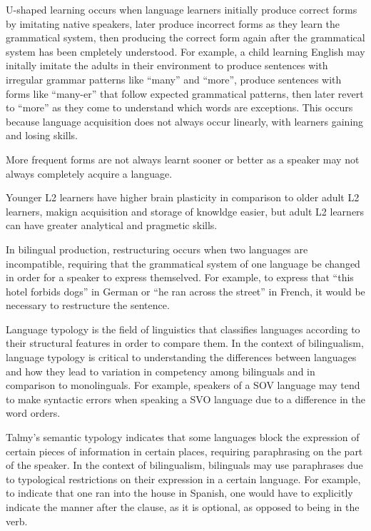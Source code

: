 \documentclass{article}
\begin{document}
\clearpage

\problem
U-shaped learning occurs when language learners initially produce correct forms by imitating native speakers, later produce incorrect forms as they learn the grammatical system, then producing the correct form again after the grammatical system has been cmpletely understood. For example, a child learning English may initally imitate the adults in their environment to produce sentences with irregular grammar patterns like ``many'' and ``more'', produce sentences with forms like ``many-er'' that follow expected grammatical patterns, then later revert to ``more'' as they come to understand which words are exceptions. This occurs because language acquisition does not always occur linearly, with learners gaining and losing skills.

\clearpage

\problem
More frequent forms are not always learnt sooner or better as a speaker may not always completely acquire a language.

\clearpage

\problem
Younger L2 learners have higher brain plasticity in comparison to older adult L2 learners, makign acquisition and storage of knowldge easier, but adult L2 learners can have greater analytical and pragmetic skills.

\clearpage

\problem
In bilingual production, restructuring occurs when two languages are incompatible, requiring that the grammatical system of one language be changed in order for a speaker to express themselved. For example, to express that ``this hotel forbids dogs'' in German or ``he ran across the street'' in French, it would be necessary to restructure the sentence.

\clearpage

\problem
Language typology is the field of linguistics that classifies languages according to their structural features in order to compare them. In the context of bilingualism, language typology is critical to understanding the differences between languages and how they lead to variation in competency among bilinguals and in comparison to monolinguals. For example, speakers of a SOV language may tend to make syntactic errors when speaking a SVO language due to a difference in the word orders.

\clearpage

\problem
Talmy's semantic typology indicates that some languages block the expression of certain pieces of information in certain places, requiring paraphrasing on the part of the speaker. In the context of bilingualism, bilinguals may use paraphrases due to typological restrictions on their expression in a certain language. For example, to indicate that one ran into the house in Spanish, one would have to explicitly indicate the manner after the clause, as it is optional, as opposed to being in the verb.
\end{document}
